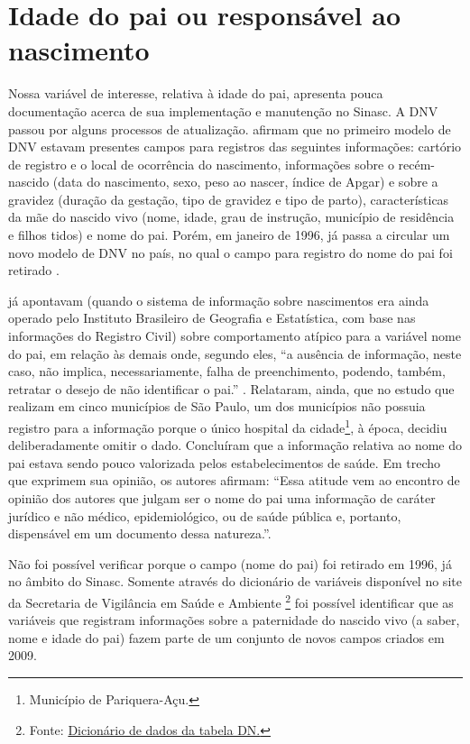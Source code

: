 
\section{Idade do pai ou responsável ao nascimento}\label{var_interesse}

Nossa variável de interesse, relativa à idade do pai, apresenta pouca documentação acerca de sua implementação e manutenção no Sinasc. A DNV passou por alguns processos de atualização.  afirmam que no primeiro modelo de DNV estavam presentes campos para registros das seguintes informações: cartório de registro e o local de ocorrência do nascimento, informações sobre o recém-nascido (data do nascimento, sexo, peso ao nascer, índice de Apgar) e sobre a gravidez (duração da gestação, tipo de gravidez e tipo de parto), características da mãe do nascido vivo (nome, idade, grau de instrução, município de residência e filhos tidos) e nome do pai. Porém, em janeiro de 1996, já passa a circular um novo modelo de DNV no país, no qual o campo para registro do nome do pai foi retirado \cite{jorge2007quality}.

 já apontavam (quando o sistema de informação sobre nascimentos era ainda operado pelo Instituto Brasileiro de Geografia e Estatística, com base nas informações do Registro Civil) sobre comportamento atípico para a variável nome do pai, em relação às demais onde, segundo eles, “a ausência de informação, neste caso, não implica, necessariamente, falha de preenchimento, podendo, também, retratar o desejo de não identificar o pai.” \cite[p.21]{mello1993avaliaccao}. Relataram, ainda, que no estudo que realizam em cinco municípios de São Paulo, um dos municípios não possuia registro para a informação porque o único hospital da cidade\footnote{Município de Pariquera-Açu.}, à época, decidiu deliberadamente omitir o dado. Concluíram que a informação relativa ao nome do pai estava sendo pouco valorizada pelos estabelecimentos de saúde. Em trecho que exprimem sua opinião, os autores afirmam: “Essa atitude vem ao encontro de opinião dos autores que julgam ser o nome do pai uma informação de caráter jurídico e não médico, epidemiológico, ou de saúde pública e, portanto, dispensável em um documento dessa natureza.”\cite[p.21]{mello1993avaliaccao}.

Não foi possível verificar porque o campo (nome do pai) foi retirado em 1996, já no âmbito do Sinasc. Somente através do dicionário de variáveis disponível no site da Secretaria de Vigilância em Saúde e Ambiente \footnote{Fonte: \href{https://svs.aids.gov.br/daent/cgiae/sinasc/documentacao/dicionario_de_dados_SINASC_tabela_DN.pdf}{Dicionário de dados da tabela DN.}} foi possível identificar que as variáveis que registram informações sobre a paternidade do nascido vivo (a saber, nome e idade do pai) fazem parte de um conjunto de novos campos criados em 2009. 

